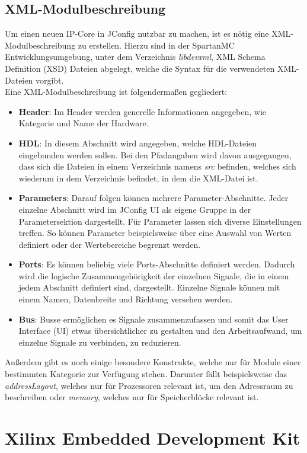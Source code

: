 \subsection{XML-Modulbeschreibung} \label{subsec:xml}
Um einen neuen IP-Core in JConfig nutzbar zu machen, ist es nötig eine XML-Modulbeschreibung zu erstellen. Hierzu sind in der SpartanMC Entwicklungsumgebung, unter dem Verzeichnis \textit{libdevxml}, XML Schema Definition (XSD) Dateien abgelegt, welche die Syntax für die verwendeten XML-Dateien
vorgibt.\\
Eine XML-Modulbeschreibung ist folgendermaßen gegliedert:
\begin{itemize}
\item \textbf{Header}: Im Header werden generelle Informationen angegeben, wie Kategorie und Name der Hardware.
\item \textbf{HDL}: In diesem Abschnitt wird angegeben, welche HDL-Dateien eingebunden werden sollen. Bei den Pfadangaben wird davon ausgegangen, dass sich die Dateien in einem Verzeichnis namens \textit{src} befinden, welches sich wiederum in dem Verzeichnis befindet, in dem die XML-Datei ist.
\item \textbf{Parameters}: Darauf folgen können mehrere Parameter-Abschnitte. Jeder einzelne Abschnitt wird im JConfig UI als eigene Gruppe in der Parametersektion dargestellt. Für Parameter lassen sich diverse Einstellungen treffen. So können Parameter beispielsweise über eine Auswahl von Werten definiert oder der Wertebereiche begrenzt werden.
\item \textbf{Ports}: Es können beliebig viele Ports-Abschnitte definiert werden. Dadurch wird die logische Zusammengehörigkeit der einzelnen Signale, die in einem jedem Abschnitt definiert sind, dargestellt. Einzelne Signale können mit einem Namen, Datenbreite und Richtung versehen werden.
\item \textbf{Bus}: Busse ermöglichen es Signale zusammenzufassen und somit das User Interface (UI) etwas übersichtlicher zu gestalten und den Arbeitsaufwand, um einzelne Signale zu verbinden, zu reduzieren.
\end{itemize} 
Außerdem gibt es noch einige besondere Konstrukte, welche nur für Module einer bestimmten Kategorie zur Verfügung stehen. Darunter fällt beispielsweise das \textit{addressLayout}, welches nur für Prozessoren relevant ist, um den Adressraum zu beschreiben oder \textit{memory}, welches nur für Speicherblöcke relevant ist.

\section{Xilinx Embedded Development Kit}
